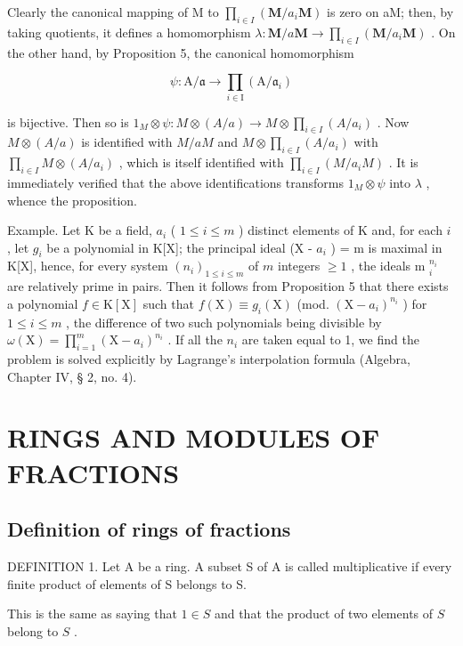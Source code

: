 Clearly the canonical mapping of M to \(\prod_{i\in I}(\mathbf{M} / a_i\mathbf{M})\) is zero on aM; then, by taking quotients, it defines a homomorphism \(\lambda : \mathbf{M} / a\mathbf{M}\to \prod_{i\in I}(\mathbf{M} / a_i\mathbf{M})\) . On the other hand, by Proposition 5, the canonical homomorphism

\[
\psi \colon \mathrm{A} / \mathfrak {a} \rightarrow \prod_ {i \in \mathrm{I}} (\mathrm{A} / \mathfrak {a} _ {i})
\]

is bijective. Then so is \(1_{M} \otimes \psi: M \otimes (A/a) \to M \otimes \prod_{i \in I} (A/a_i)\) . Now \(M \otimes (A/a)\) is identified with \(M/aM\) and \(M \otimes \prod_{i \in I} (A/a_i)\) with \(\prod_{i \in I} M \otimes (A/a_i)\) , which is itself identified with \(\prod_{i \in I} (M/a_iM)\) . It is immediately verified that the above identifications transforms \(1_M \otimes \psi\) into \(\lambda\) , whence the proposition.

Example. Let K be a field, \(a_{i}\) ( \(1 \leqslant i \leqslant m\) ) distinct elements of K and, for each \(i\) , let \(g_{i}\) be a polynomial in K{[}X{]}; the principal ideal (X - \(a_{i}\) ) = m is maximal in K{[}X{]}, hence, for every system \((n_{i})_{1 \leqslant i \leqslant m}\) of \(m\) integers \(\geqslant 1\) , the ideals m \(_{i}^{n_{i}}\) are relatively prime in pairs. Then it follows from Proposition 5 that there exists a polynomial \(f \in \mathrm{K}[\mathrm{X}]\) such that \(f(\mathrm{X}) \equiv g_{i}(\mathrm{X})\) (mod. \((\mathrm{X} - a_{i})^{n_{i}}\) ) for \(1 \leqslant i \leqslant m\) , the difference of two such polynomials being divisible by \(\omega(\mathrm{X}) = \prod_{i=1}^{m} (\mathrm{X} - a_{i})^{n_{i}}\) . If all the \(n_{i}\) are taken equal to 1, we find the problem is solved explicitly by Lagrange's interpolation formula (Algebra, Chapter IV, § 2, no. 4).

\section{RINGS AND MODULES OF FRACTIONS}

\subsection{Definition of rings of fractions}

DEFINITION 1. Let A be a ring. A subset S of A is called multiplicative if every finite product of elements of S belongs to S.

This is the same as saying that \(1 \in S\) and that the product of two elements of \(S\) belong to \(S\) .
